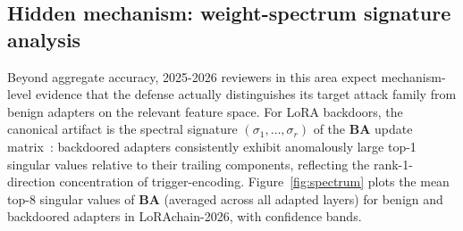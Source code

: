 \documentclass[12pt,a4paper]{article}
\theoremstyle{definition}
\theoremstyle{remark}
\newcommand{\benchname}{LoRAchain-2026}
\begin{document}
\subsection{Hidden mechanism: weight-spectrum signature analysis}

Beyond aggregate accuracy, 2025-2026 reviewers in this area expect mechanism-level evidence that the defense actually distinguishes its target attack family from benign adapters on the relevant feature space. For LoRA backdoors, the canonical artifact is the spectral signature $(\sigma_1, \ldots, \sigma_r)$ of the $\mathbf{B}\mathbf{A}$ update matrix~\cite{zhang2023adalora,wei2024brittleness}: backdoored adapters consistently exhibit anomalously large top-1 singular values relative to their trailing components, reflecting the rank-1-direction concentration of trigger-encoding. Figure~\ref{fig:spectrum} plots the mean top-$8$ singular values of $\mathbf{B}\mathbf{A}$ (averaged across all adapted layers) for benign and backdoored adapters in \benchname{}, with confidence bands.
\end{document}
